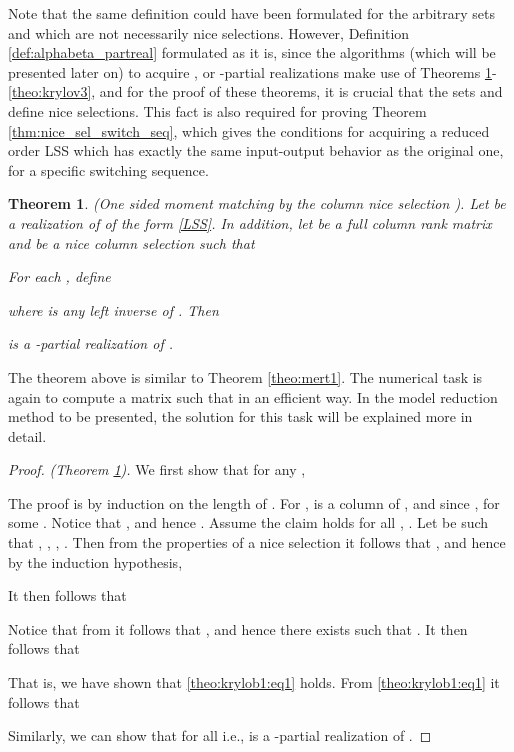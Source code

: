 \documentclass[journal]{IEEEtran}
\newtheorem{Theorem}{Theorem}
\begin{document}
Note that the same definition could have been formulated for the arbitrary sets  and  which are not necessarily nice selections. However, Definition \ref{def:alphabeta_partreal} formulated as it is, since the algorithms (which will be presented later on) to acquire ,  or -partial realizations make use of Theorems \ref{theo:krylov1}-\ref{theo:krylov3}, and for the proof of these theorems, it is crucial that the sets  and  define nice selections. This fact is also required for proving Theorem \ref{thm:nice_sel_switch_seq}, which gives the conditions for acquiring a reduced order LSS which has exactly the same input-output behavior as the original one, for a specific switching sequence.

\begin{Theorem} \label{theo:krylov1}
	\emph{(One sided moment matching by the column nice selection ).}
	Let  be a realization of  of the form \eqref{LSS}. In addition, let  be a full column rank matrix and  be a nice column selection such that
	
	For each , define
	
	where  is any left inverse of .
	Then
	
	is a -partial realization of .
\end{Theorem}

The theorem above is similar to Theorem \ref{theo:mert1}. The numerical task is again to compute a matrix  such that  in an efficient way. In the model reduction method to be presented, the solution for this task will be explained more in detail.

\begin{proof}\emph{(Theorem \ref{theo:krylov1}).}
	We first show that for any ,
	
	
	
	The proof is by induction on the length of . For ,  is a column of , and since ,  for some . Notice that  , and hence . Assume the claim holds for all , . Let  be such that , , , . Then from the properties of a nice selection it follows that , and hence by the induction hypothesis,
	
	It then follows that
	
	Notice that from  it follows that , and hence there exists  such that . It then follows that
	
	That is, we have shown that \eqref{theo:krylob1:eq1} holds.
	From \eqref{theo:krylob1:eq1} it follows that
	
	Similarly, we can show that  for all  i.e.,  is a -partial realization of .
\end{proof}
\end{document}
